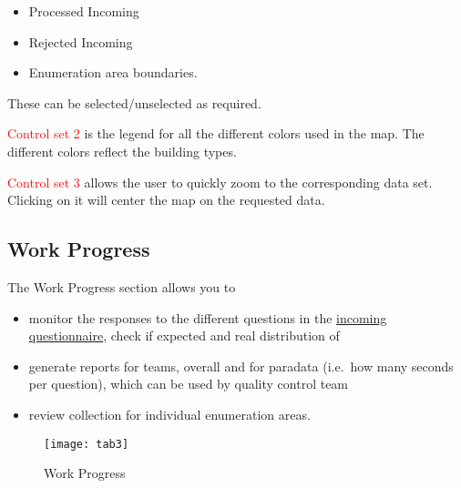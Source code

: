 \documentclass[a4paper]{article}
\providecommand{\tightlist}{%
  \setlength{\itemsep}{0pt}\setlength{\parskip}{0pt}}
\begin{document}
\begin{itemize}
\tightlist
\item
  Processed Incoming
\item
  Rejected Incoming
\item
  Enumeration area boundaries.
\end{itemize}

These can be selected/unselected as required. \newline

\textcolor{red}{Control set 2} is the legend for all the different colors used in the map. The different colors reflect the building types. \newline

\textcolor{red}{Control set 3} allows the user to quickly zoom to the corresponding data set. Clicking on it will center the map on the requested data.
\newpage

\hypertarget{work-progress}{%
\subsection{Work Progress}\label{work-progress}}

The Work Progress section allows you to

\begin{itemize}
\tightlist
\item
  monitor the responses to the different questions in the \underline{incoming questionnaire}, check if expected and real distribution of
\item
  generate reports for teams, overall and for paradata (i.e.~how many seconds per question), which can be used by quality control team
\item
  review collection for individual enumeration areas.
\end{itemize}

\begin{figure}

{\centering \texttt{[image: tab3]} 

}

\caption{Work Progress}\label{fig:tab3}
\end{figure}
\end{document}
